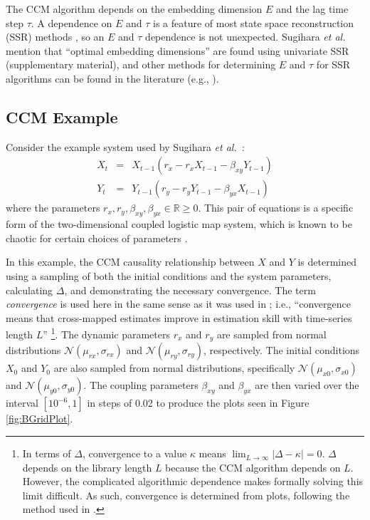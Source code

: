 \documentclass[twocolumn,aps,pre,groupedaddress]{revtex4-1}
\begin{document}
The CCM algorithm depends on the embedding dimension $E$ and the lag time step $\tau$.  A dependence on $E$ and $\tau$ is a feature of most state space reconstruction (SSR) methods \cite{Hong2006,vlachos2009,Small2004}, so an $E$ and $\tau$ dependence is not unexpected.  Sugihara {\em et al.} mention that ``optimal embedding dimensions'' are found using univariate SSR \cite{Sugihara2012} (supplementary material), and other methods for determining $E$ and $\tau$ for SSR algorithms can be found in the literature (e.g., \cite{Hong2006,Small2004,Kennel1992}).

\subsection{CCM Example}
\label{sec:2Pop}
Consider the example system used by Sugihara {\em et al.\ }\cite{Sugihara2012}:
\begin{eqnarray}
\label{eqn:2pop}
X_t &=& X_{t-1}\left(r_x-r_x X_{t-1}-\beta_{xy} Y_{t-1}\right)\\
Y_t &=& Y_{t-1}\left(r_y-r_y Y_{t-1}-\beta_{yx} X_{t-1}\right)
\end{eqnarray}
where the parameters $r_x,r_y,\beta_{xy},\beta_{yx}\in\mathbb{R}\ge 0$.  This pair of equations is a specific form of the two-dimensional coupled logistic map system, which is known to be chaotic for certain choices of parameters \cite{Lloyd1995}.

In this example, the CCM causality relationship between $X$ and $Y$ is determined using a sampling of both the initial conditions and the system parameters, calculating $\Delta$, and demonstrating the necessary convergence.  The term {\em convergence} is used here in the same sense as it was used in \cite{Sugihara2012}; i.e., ``convergence means that cross-mapped estimates improve in estimation skill with time-series length $L$'' \footnote{In terms of $\Delta$, convergence to a value $\kappa$ means $\lim_{L\rightarrow\infty}|\Delta-\kappa| = 0$.  $\Delta$ depends on the library length $L$ because the CCM algorithm depends on $L$.  However, the complicated algorithmic dependence makes formally solving this limit difficult.  As such, convergence is determined from plots, following the method used in  \cite{Sugihara2012}.}.  The dynamic parameters $r_x$ and $r_y$ are sampled from normal distributions $\mathcal{N}\left(\mu_{rx},\sigma_{rx}\right)$ and $\mathcal{N}\left(\mu_{ry},\sigma_{ry}\right)$, respectively.  The initial conditions $X_0$ and $Y_0$ are also sampled from normal distributions, specifically $\mathcal{N}\left(\mu_{x0},\sigma_{x0}\right)$ and $\mathcal{N}\left(\mu_{y0},\sigma_{y0}\right)$.  The coupling parameters $\beta_{xy}$ and $\beta_{yx}$ are then varied over the interval $[10^{-6},1]$ in steps of 0.02 to produce the plots seen in Figure \ref{fig:BGridPlot}.
\end{document}
